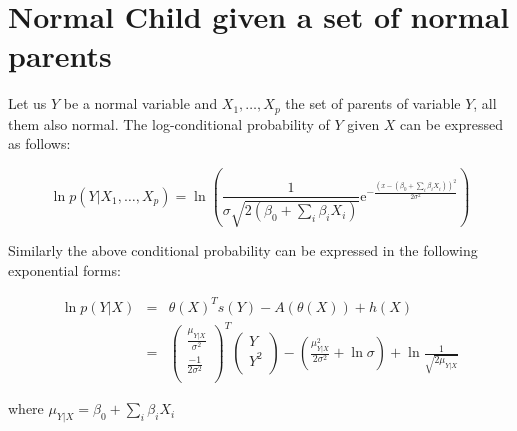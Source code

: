\documentclass[11pt, oneside]{article}   	%
\newcommand{\me}{\mathrm{e}}
\numberwithin{figure}{section}
\numberwithin{equation}{section}
\numberwithin{table}{section}
\begin{document}
\section{Normal Child given a set of normal parents}

Let us $Y$ be a normal variable and $X_1,\ldots,X_p$ the set of parents of variable $Y$, all them also normal. The log-conditional probability of $Y$ given $X$ can be expressed as follows:

$$ \ln p(Y|X_1,\ldots,X_p) = \ln \left(\frac{1}{\sigma \sqrt{2(\beta_0+\sum_i \beta_i X_i )}} \me^{-\frac{(x-(\beta_0+\sum_i \beta_i X_i))^2}{2\sigma^2}} \right)$$


Similarly the above conditional probability can be expressed in the following exponential forms:

\begin{eqnarray*}
\ln p(Y|X) &=& \theta(X)^T s(Y) - A(\theta(X)) + h(X)\\
&=&
\begin{pmatrix}
\frac{\mu_{Y|X}}{\sigma^2}\\
\frac{-1}{2\sigma^2}\\
\end{pmatrix}^T
\begin{pmatrix}
Y\\
Y^2\\
\end{pmatrix}
- \left(\frac{\mu_{Y|X}^2}{2\sigma^2} + \ln{\sigma}\right) + \ln{\frac{1}{\sqrt{2\mu_{Y|X}}}} 
\end{eqnarray*}

where $\mu_{Y|X} = \beta_0+\sum_i{\beta_i X_i}$
\end{document}
